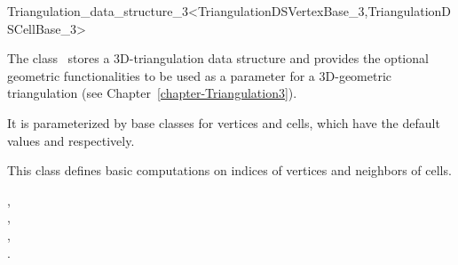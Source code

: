

\begin{ccRefClass}{Triangulation_data_structure_3<TriangulationDSVertexBase_3,TriangulationDSCellBase_3>}  %


\ccDefinition
The class \ccRefName\ stores a 3D-triangulation data structure
and provides the optional
geometric functionalities to be used as a parameter for a 
3D-geometric triangulation (see Chapter~\ref{chapter-Triangulation3}). 

It is parameterized by base classes for vertices and cells, which have the
default values  and
 respectively.

\ccIsModel



This class  defines basic computations on
indices of vertices and neighbors of cells. 


\ccSeeAlso

,\\
,\\
,\\
.




\end{ccRefClass}


